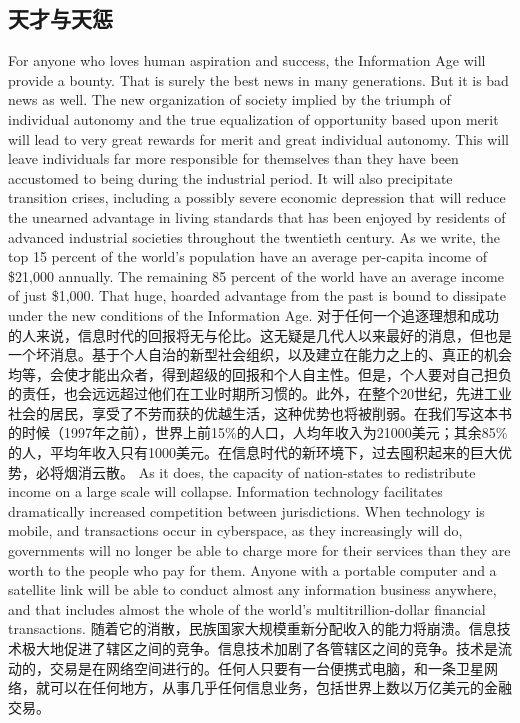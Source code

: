 \subsection{天才与天惩}
\begin{paracol}{2}[]
For anyone who loves human aspiration and success, the Information Age will provide a bounty. That is surely the best news in many generations. But it is bad news as well. The new organization of society implied by the triumph of individual autonomy and the true equalization of opportunity based upon merit will lead to very great rewards for merit and great individual autonomy. This will leave individuals far more responsible for themselves than they have been accustomed to being during the industrial period. It will also precipitate transition crises, including a possibly severe economic depression that will reduce the unearned advantage in living standards that has been enjoyed by residents of advanced industrial societies throughout the twentieth century.  As we write, the top 15 percent of the world's population have an average per-capita income of \$21,000 annually. The remaining 85 percent of the world have an average income of just \$1,000. That huge, hoarded advantage from the past is bound to dissipate under the new conditions of the Information Age. 
\switchcolumn
对于任何一个追逐理想和成功的人来说，信息时代的回报将无与伦比。这无疑是几代人以来最好的消息，但也是一个坏消息。基于个人自治的新型社会组织，以及建立在能力之上的、真正的机会均等，会使才能出众者，得到超级的回报和个人自主性。但是，个人要对自己担负的责任，也会远远超过他们在工业时期所习惯的。此外，在整个20世纪，先进工业社会的居民，享受了不劳而获的优越生活，这种优势也将被削弱。在我们写这本书的时候（1997年之前），世界上前15\%的人口，人均年收入为21000美元；其余85\%的人，平均年收入只有1000美元。在信息时代的新环境下，过去囤积起来的巨大优势，必将烟消云散。
\switchcolumn*
As it does, the capacity of nation-states to redistribute income on a large scale will collapse. Information technology facilitates dramatically increased competition between jurisdictions. When technology is mobile, and transactions occur in cyberspace, as they increasingly will do, governments will no longer be able to charge more for their services than they are worth to the people who pay for them. Anyone with a portable computer and a satellite link will be able to conduct almost any information business anywhere, and that includes almost the whole of the world's multitrillion-dollar financial transactions. 
\switchcolumn
随着它的消散，民族国家大规模重新分配收入的能力将崩溃。信息技术极大地促进了辖区之间的竞争。信息技术加剧了各管辖区之间的竞争。技术是流动的，交易是在网络空间进行的。任何人只要有一台便携式电脑，和一条卫星网络，就可以在任何地方，从事几乎任何信息业务，包括世界上数以万亿美元的金融交易。

\end{paracol}
